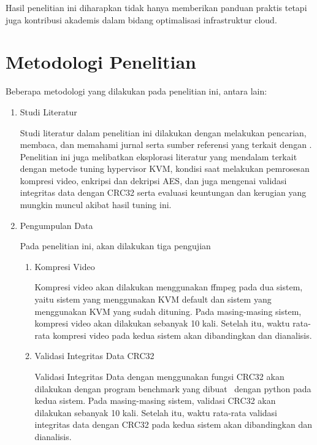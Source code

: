Hasil penelitian ini diharapkan tidak hanya memberikan panduan praktis tetapi juga kontribusi akademis dalam bidang optimalisasi infrastruktur cloud.

\section{Metodologi Penelitian}
Beberapa metodologi yang dilakukan pada penelitian ini, antara lain:
\begin{enumerate}
      \item Studi Literatur

            Studi literatur dalam penelitian ini dilakukan dengan melakukan pencarian, membaca, dan memahami jurnal serta sumber referensi yang terkait dengan \cc. Penelitian ini juga melibatkan eksplorasi literatur yang mendalam terkait dengan metode tuning hypervisor KVM, kondisi saat melakukan pemrosesan kompresi video, enkripsi dan dekripsi AES, dan juga mengenai validasi integritas data dengan CRC32 serta evaluasi keuntungan dan kerugian yang mungkin muncul akibat hasil tuning ini.

      \item Pengumpulan Data

            Pada penelitian ini, akan dilakukan tiga pengujian
            \begin{enumerate}
                  \item Kompresi Video

                        Kompresi video akan dilakukan menggunakan ffmpeg pada dua sistem, yaitu sistem yang menggunakan KVM default dan sistem yang menggunakan KVM yang sudah dituning. Pada masing-masing sistem, kompresi video akan dilakukan sebanyak 10 kali. Setelah itu, waktu rata-rata kompresi video pada kedua sistem akan dibandingkan dan dianalisis.

                  \item Validasi Integritas Data CRC32

                        Validasi Integritas Data dengan menggunakan fungsi CRC32 akan dilakukan dengan program benchmark yang dibuat \saya\ dengan python pada kedua sistem. Pada masing-masing sistem, validasi CRC32 akan dilakukan sebanyak 10 kali. Setelah itu, waktu rata-rata validasi integritas data dengan CRC32 pada kedua sistem akan dibandingkan dan dianalisis.


\end{enumerate}
\end{enumerate}
